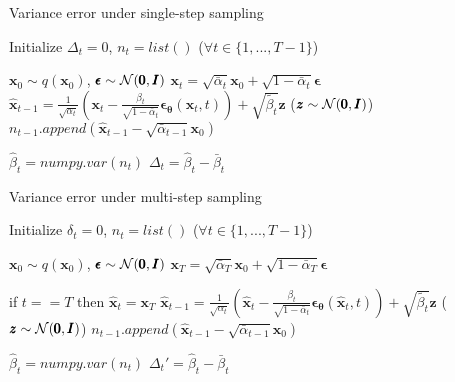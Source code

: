 \documentclass{article} \usepackage{iclr2024_conference,times}
\begin{document}
\begin{minipage}{0.48\textwidth}
\begin{algorithm}[H]
    \centering
    \caption{Variance error under single-step sampling}
    \label{alg: single-step}
    \begin{algorithmic}[1]
        \STATE Initialize $\Delta_t = 0$, $n_t = list()$ ($\forall t \in \{1, ..., T-1 \}$)
        
        \REPEAT
        \STATE $\pmb{x}_0 \sim q(\pmb{x}_0)$, $\pmb{\epsilon} \sim {\cal N} (\pmb{0}, \pmb{I})$
        \STATE $\pmb{x}_t = \sqrt{\bar{\alpha}_t} \pmb{x}_0 +   \sqrt{1 - \bar{\alpha}_t} \pmb{\epsilon}$
        \STATE $\hat{\pmb{x}}_{t-1} = \frac{1}{\sqrt{\alpha_{t}}} (\pmb{x}_{t} - \frac{\beta_{t}}{\sqrt{1-\bar{\alpha}_{t}}} \pmb{\epsilon}_{\pmb{\theta}} (\pmb{x}_{t}, t)) + \sqrt{\tilde{\beta_t}} \pmb{z}$ \quad ($\pmb{z} \sim {\cal N} (\pmb{0}, \pmb{I})$)
        \STATE $n_{t-1}.append(\hat{\pmb{x}}_{t-1} - \sqrt{\bar{\alpha}_{t-1}} \pmb{x}_0)$
        \ENDFOR
        
        
        \STATE $\hat{\beta}_t = numpy.var(n_t)$
        \STATE $\Delta_t = \hat{\beta}_t - \bar{\beta}_t$
        \ENDFOR
    \end{algorithmic}
\end{algorithm}
\end{minipage}
\hfill
\begin{minipage}{0.48\textwidth}
\begin{algorithm}[H]
    \centering
    \caption{Variance error under multi-step sampling}
    \label{alg: multi-step}
    \begin{algorithmic}[1]
        \STATE Initialize $\delta_t = 0$, $n_t = list()$ ($\forall t \in \{1, ..., T-1 \}$)
        
        \REPEAT
        \STATE $\pmb{x}_0 \sim q(\pmb{x}_0)$, $\pmb{\epsilon} \sim {\cal N} (\pmb{0}, \pmb{I})$
        \STATE $\pmb{x}_T = \sqrt{\bar{\alpha}_T} \pmb{x}_0 +   \sqrt{1 - \bar{\alpha}_T}\pmb{\epsilon}$
        
        \STATE if $t == T$ then $\hat{\pmb{x}}_{t} = \pmb{x}_T$
        \STATE $\hat{\pmb{x}}_{t-1} = \frac{1}{\sqrt{\alpha_{t}}} (\hat{\pmb{x}}_{t} - \frac{\beta_{t}}{\sqrt{1-\bar{\alpha}_{t}}} \pmb{\epsilon}_{\pmb{\theta}} (\hat{\pmb{x}}_{t}, t)) + \sqrt{\tilde{\beta_t}} \pmb{z}$ \quad ($\pmb{z} \sim {\cal N} (\pmb{0}, \pmb{I})$)
        \STATE $n_{t-1}.append(\hat{\pmb{x}}_{t-1} - \sqrt{\bar{\alpha}_{t-1}} \pmb{x}_0)$ 
        \ENDFOR
        
        \STATE $\hat{\beta}_t = numpy.var(n_t)$
        \STATE $\Delta_t' = \hat{\beta}_t - \bar{\beta}_t$
        \ENDFOR
    \end{algorithmic}
\end{algorithm}
\end{minipage}
\end{document}
